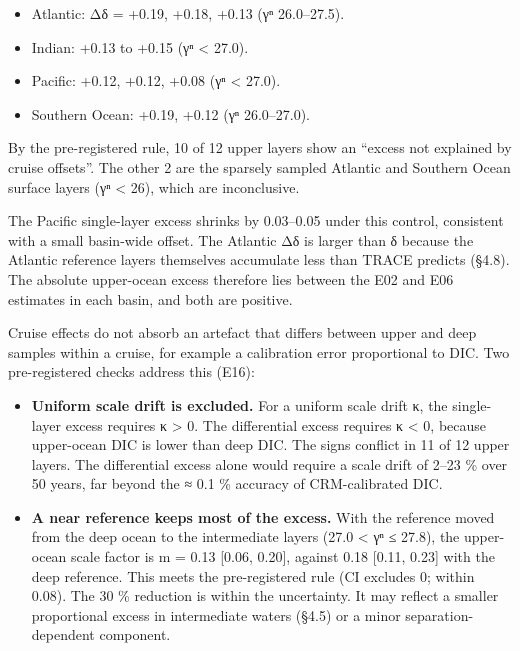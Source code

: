 \documentclass[11pt]{article}
\providecommand{\tightlist}{\setlength{\itemsep}{0pt}\setlength{\parskip}{0pt}}
\begin{document}
\begin{itemize}
\tightlist
\item
  Atlantic: Δδ = +0.19, +0.18, +0.13 (γⁿ 26.0--27.5).
\item
  Indian: +0.13 to +0.15 (γⁿ \textless{} 27.0).
\item
  Pacific: +0.12, +0.12, +0.08 (γⁿ \textless{} 27.0).
\item
  Southern Ocean: +0.19, +0.12 (γⁿ 26.0--27.0).
\end{itemize}

By the pre-registered rule, 10 of 12 upper layers show an ``excess not
explained by cruise offsets''. The other 2 are the sparsely sampled
Atlantic and Southern Ocean surface layers (γⁿ \textless{} 26), which
are inconclusive.

The Pacific single-layer excess shrinks by 0.03--0.05 under this
control, consistent with a small basin-wide offset. The Atlantic Δδ is
larger than δ because the Atlantic reference layers themselves
accumulate less than TRACE predicts (§4.8). The absolute upper-ocean
excess therefore lies between the E02 and E06 estimates in each basin,
and both are positive.

Cruise effects do not absorb an artefact that differs between upper and
deep samples within a cruise, for example a calibration error
proportional to DIC. Two pre-registered checks address this (E16):

\begin{itemize}
\tightlist
\item
  \textbf{Uniform scale drift is excluded.} For a uniform scale drift κ,
  the single-layer excess requires κ \textgreater{} 0. The differential
  excess requires κ \textless{} 0, because upper-ocean DIC is lower than
  deep DIC. The signs conflict in 11 of 12 upper layers. The
  differential excess alone would require a scale drift of 2--23 \% over
  50 years, far beyond the ≈ 0.1 \% accuracy of CRM-calibrated DIC.
\item
  \textbf{A near reference keeps most of the excess.} With the reference
  moved from the deep ocean to the intermediate layers (27.0 \textless{}
  γⁿ ≤ 27.8), the upper-ocean scale factor is m = 0.13 {[}0.06, 0.20{]},
  against 0.18 {[}0.11, 0.23{]} with the deep reference. This meets the
  pre-registered rule (CI excludes 0; within 0.08). The 30 \% reduction
  is within the uncertainty. It may reflect a smaller proportional
  excess in intermediate waters (§4.5) or a minor separation-dependent
  component.
\end{itemize}
\end{document}
